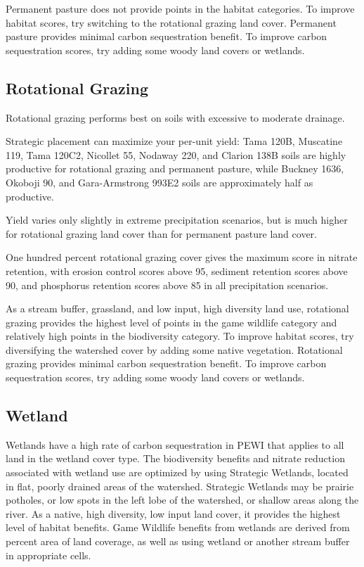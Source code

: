 \documentclass[11pt]{article}
\begin{document}
Permanent pasture does not provide points in the habitat categories. To improve habitat scores, try switching to the rotational grazing land cover. Permanent pasture provides minimal carbon sequestration benefit.  To improve carbon sequestration scores, try adding some woody land covers or wetlands.

\subsection{Rotational Grazing}

Rotational grazing performs best on soils with excessive to moderate drainage.

Strategic placement can maximize your per-unit yield: Tama 120B, Muscatine 119, Tama 120C2, Nicollet 55, Nodaway 220, and Clarion 138B soils are highly productive for rotational grazing and permanent pasture, while Buckney 1636, Okoboji 90, and Gara-Armstrong 993E2 soils are approximately half as productive.

Yield varies only slightly in extreme precipitation scenarios, but is much higher for rotational grazing land cover than for permanent pasture land cover.

One hundred percent rotational grazing cover gives the maximum score in nitrate retention, with erosion control scores above 95, sediment retention scores above 90, and phosphorus retention scores above 85 in all precipitation scenarios.

As a stream buffer, grassland, and low input, high diversity land use, rotational grazing provides the highest level of points in the game wildlife category and relatively high points in the biodiversity category. To improve habitat scores, try diversifying the watershed cover by adding some native vegetation. Rotational grazing provides minimal carbon sequestration benefit.  To improve carbon sequestration scores, try adding some woody land covers or wetlands.

\subsection{Wetland}

Wetlands have a high rate of carbon sequestration in PEWI that applies to all land in the wetland cover type. The biodiversity benefits and nitrate reduction associated with wetland use are optimized by using Strategic Wetlands, located in flat, poorly drained areas of the watershed. Strategic Wetlands may be prairie potholes, or low spots in the left lobe of the watershed, or shallow areas along the river. As a native, high diversity, low input land cover, it provides the highest level of habitat benefits. Game Wildlife benefits from wetlands are derived from percent area of land coverage, as well as using wetland or another stream buffer in appropriate cells. 
\end{document}
